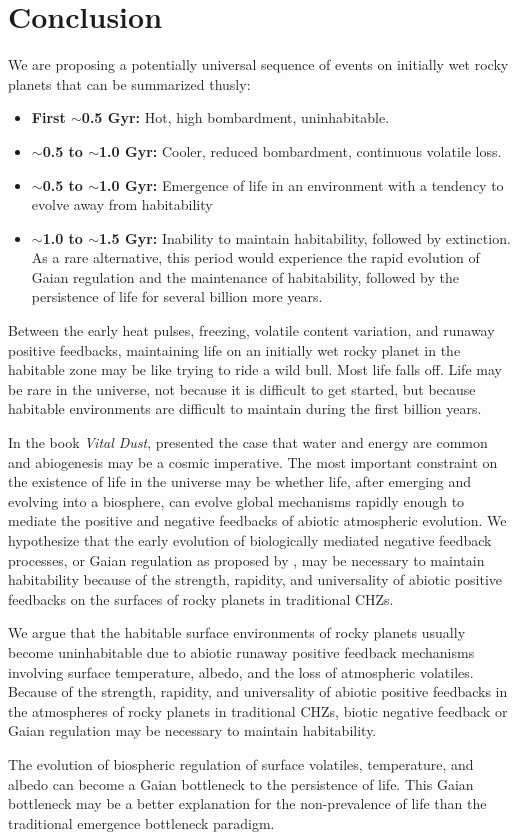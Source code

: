 \section{Conclusion}
We are proposing a potentially universal sequence of events on initially wet rocky planets that can be summarized thusly:
\begin{itemize}
	\item[]\textbf{First $\sim$0.5 Gyr:} Hot, high bombardment, uninhabitable.
	\item[]\textbf{$\sim$0.5 to $\sim$1.0 Gyr:} Cooler, reduced bombardment, continuous volatile loss.
	\item[]\textbf{$\sim$0.5 to $\sim$1.0 Gyr:} Emergence of life in an environment with a tendency to evolve away from habitability
	\item[]\textbf{$\sim$1.0 to $\sim$1.5 Gyr:} Inability to maintain habitability, followed by extinction.
	As a rare alternative, this period would experience the rapid evolution of Gaian regulation and the maintenance of habitability, followed by the persistence of life for several billion more years. 
\end{itemize}
Between the early heat pulses, freezing, volatile content variation, and runaway positive feedbacks, maintaining life on an initially wet rocky planet in the habitable zone may be like trying to ride a wild bull. Most life falls off.  Life may be rare in the universe, not because it is difficult to get started, but because habitable environments are difficult to maintain during the first billion years.

In the book \textit{Vital Dust}, \citet{DeDuve1995} presented the case that water and energy are common and abiogenesis may be a cosmic imperative. The most important constraint on the existence of life in the universe may be whether life, after emerging and evolving into a biosphere, can evolve global mechanisms 
rapidly enough to mediate the positive and negative feedbacks of abiotic atmospheric evolution. We hypothesize that the early evolution of biologically mediated negative feedback processes, or Gaian regulation as proposed by \citet{Lovelock1974}, may be necessary to maintain habitability because of the strength, rapidity, and universality of abiotic positive feedbacks on the surfaces of rocky planets in traditional CHZs.

We argue that the habitable surface environments of rocky planets usually become uninhabitable due to abiotic runaway positive feedback mechanisms involving surface temperature, albedo, and the loss of atmospheric volatiles. Because of the strength, rapidity, and universality of abiotic positive feedbacks in the atmospheres of rocky planets in traditional CHZs, biotic negative feedback or Gaian regulation may be necessary to maintain habitability.

The evolution of biospheric regulation of surface volatiles, temperature, and albedo can become a Gaian bottleneck to the persistence of life. This Gaian bottleneck may be a better explanation for the non-prevalence of life than the traditional emergence bottleneck paradigm. 